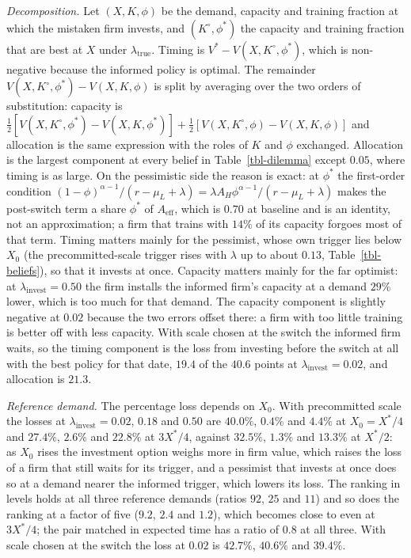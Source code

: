 \documentclass[
  11pt,
  letterpaper,
]{scrartcl}
\begin{document}
\emph{Decomposition.} Let \((X, K, \phi)\) be the demand, capacity and
training fraction at which the mistaken firm invests, and
\((K^\circ, \phi^*)\) the capacity and training fraction that are best
at \(X\) under \(\lambda_{\text{true}}\). Timing is
\(V^* - V(X, K^\circ, \phi^*)\), which is non-negative because the
informed policy is optimal. The remainder
\(V(X, K^\circ, \phi^*) - V(X, K, \phi)\) is split by averaging over the
two orders of substitution: capacity is
\(\tfrac{1}{2}[V(X, K^\circ, \phi^*) - V(X, K, \phi^*)] + \tfrac{1}{2}[V(X, K^\circ, \phi) - V(X, K, \phi)]\)
and allocation is the same expression with the roles of \(K\) and
\(\phi\) exchanged. Allocation is the largest component at every belief
in Table~\ref{tbl-dilemma} except \(0.05\), where timing is as large. On
the pessimistic side the reason is exact: at \(\phi^*\) the first-order
condition
\((1-\phi)^{\alpha-1}/(r - \mu_L + \lambda) = \lambda A_H \phi^{\alpha-1}/(r - \mu_L + \lambda)\)
makes the post-switch term a share \(\phi^*\) of \(A_{\text{eff}}\),
which is \(0.70\) at baseline and is an identity, not an approximation;
a firm that trains with \(14\%\) of its capacity forgoes most of that
term. Timing matters mainly for the pessimist, whose own trigger lies
below \(X_0\) (the precommitted-scale trigger rises with \(\lambda\) up
to about \(0.13\), Table~\ref{tbl-beliefs}), so that it invests at once.
Capacity matters mainly for the far optimist: at
\(\lambda_{\text{invest}} = 0.50\) the firm installs the informed firm's
capacity at a demand \(29\%\) lower, which is too much for that demand.
The capacity component is slightly negative at \(0.02\) because the two
errors offset there: a firm with too little training is better off with
less capacity. With scale chosen at the switch the informed firm waits,
so the timing component is the loss from investing before the switch at
all with the best policy for that date, \(19.4\) of the \(40.6\) points
at \(\lambda_{\text{invest}} = 0.02\), and allocation is \(21.3\).

\emph{Reference demand.} The percentage loss depends on \(X_0\). With
precommitted scale the losses at \(\lambda_{\text{invest}} = 0.02\),
\(0.18\) and \(0.50\) are \(40.0\%\), \(0.4\%\) and \(4.4\%\) at
\(X_0 = X^*/4\) and \(27.4\%\), \(2.6\%\) and \(22.8\%\) at \(3X^*/4\),
against \(32.5\%\), \(1.3\%\) and \(13.3\%\) at \(X^*/2\): as \(X_0\)
rises the investment option weighs more in firm value, which raises the
loss of a firm that still waits for its trigger, and a pessimist that
invests at once does so at a demand nearer the informed trigger, which
lowers its loss. The ranking in levels holds at all three reference
demands (ratios \(92\), \(25\) and \(11\)) and so does the ranking at a
factor of five (\(9.2\), \(2.4\) and \(1.2\)), which becomes close to
even at \(3X^*/4\); the pair matched in expected time has a ratio of
\(0.8\) at all three. With scale chosen at the switch the loss at
\(0.02\) is \(42.7\%\), \(40.6\%\) and \(39.4\%\).
\end{document}
